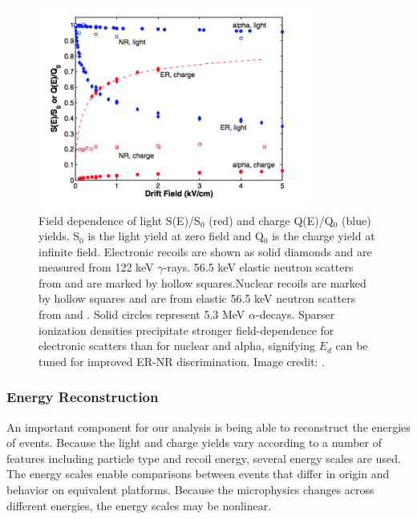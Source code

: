 \begin{figure}
\centering
\includegraphics[width=0.8\textwidth]{LYQY}
\caption[Field dependence of light and charge yields.]{Field dependence of light S(E)/S$_{0}$ (red) and charge Q(E)/Q$_{0}$ (blue)
yields.  S$_{0}$ is the light yield at zero field and Q$_{0}$ is the charge yield at
infinite field.  Electronic recoils are shown as solid diamonds and are measured from  122 keV $\gamma$-rays.  56.5
keV elastic neutron scatters from \ambe and  are marked by hollow squares.Nuclear recoils
are marked by hollow squares and are from elastic 56.5 keV neutron scatters from \ambe and .  Solid circles represent 
5.3 MeV $\alpha$-decays.  Sparser ionization densities precipitate stronger field-dependence for electronic scatters than for nuclear and
alpha, signifying $E_{d}$ can be tuned for improved ER-NR discrimination.  Image credit: .}
\label{fig:tpcs_signals_drift_field}
\end{figure}



\subsubsection{Energy Reconstruction}
\label{subsubsec:tpcs_signals_energy}
An important component for our analysis is being able to reconstruct the energies of events.  Because the light and charge yields vary
according to a number of features including particle type and recoil energy, several energy scales are used.  The energy scales enable
comparisons between events that differ in origin and behavior on equivalent platforms.  Because the microphysics changes across different
energies, the energy scales may be nonlinear.

